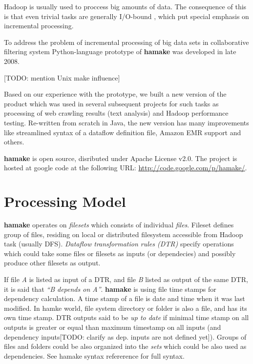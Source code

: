 \documentclass{article}
\begin{document}
Hadoop is usually used to proccess big amounts of data. The
consequence of this is that even trivial tasks are generally I/O-bound
\cite{hadoopattwitter},\cite{hs2010hadoopbench} which put special
emphasis on incremental processing.

To address the problem of incremental processing of big data sets in
collaborative filtering system Python-language prototype of
\textbf{hamake} was developed in late 2008. 

[TODO: mention Unix make influence]

Based on our experience with the prototype, we built a new version of
the product which was used in several subsequent projects for such
tasks as processing of web crawling results (text analysis) and Hadoop
performance testing. Re-written from scratch in Java, the new version
has many improvements like streamlined syntax of a dataflow definition
file, Amazon EMR support and others.

\textbf{hamake} is open source, disributed under Apache License
v2.0. The project is hosted at google code at the following URL:
\url{http://code.google.com/p/hamake/}.

\section{Processing Model}

\textbf{hamake} operates on \textit{filesets} which consists of
individual \textit{files}. Fileset defines group of files, residing on
local or distributed filesystem accessible from Hadoop task (usually
DFS). \textit{Dataflow transformation rules (DTR)} specify operations
which could take some files or filesets as inputs (or dependecies) and
possibly produce other filesets as output.

If file \textit{A} is listed as input of a DTR, and file \textit{B}
listed as output of the same DTR, it is said that \textit{``B depends
  on A''}. \textbf{hamake} is using file time stamps for dependency
calculation. A time stamp of a file is date and time when it was last
modified.  In hamke world, file system directory or folder is also a
file, and has its own time stamp. DTR outputs said to be \textit{up to
  date} if minimal time stamp on all outputs is greater or equal than
maximum timestamp on all inputs (and dependency inputs[TODO: clarify as dep. inputs are not defined yet]). Groups of
files and folders could be also organized into the \emph{sets} which
could be also used as dependencies. See hamake syntax
refererence\cite{hamakesyntax} for full syntax.
\end{document}
